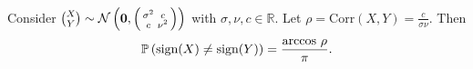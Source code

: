\begin{lemma}
\label{lemma:gaussian_sign}
Consider  $\binom{X}{Y} \sim \mathcal{N}\left( \bm{0}, \begin{psmallmatrix} \sigma^{2} & c \\ c & \nu^{2} \end{psmallmatrix} \right)$ with $\sigma, \nu, c \in \mathbb{R}$. Let $\rho = \text{Corr}(X,Y) = \frac{c}{\sigma\nu}$. Then
\begin{equation}
     \bs{\prob{\text{sign}(X) \neq \text{sign}(Y) }} = \frac{ \text{arccos }\rho }{\pi}.
\end{equation}
    
\end{lemma}
